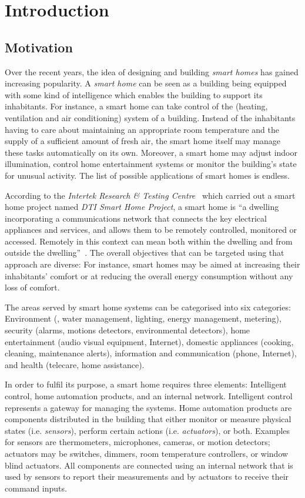 \chapter{Introduction}
\label{ch:intro}

\section{Motivation}
\label{sec:motivation}

Over the recent years, the idea of designing and building \emph{smart homes} has gained increasing popularity. A \emph{smart home} can be seen as a building being equipped with some kind of intelligence which enables the building to support its inhabitants. For instance, a smart home can take control of the  (heating, ventilation and air conditioning) system of a building. Instead of the inhabitants having to care about maintaining an appropriate room temperature and the supply of a sufficient amount of fresh air, the smart home itself may manage these tasks automatically on its own. Moreover, a smart home may adjust indoor illumination, control home entertainment systems or monitor the building's state for unusual activity. The list of possible applications of smart homes is endless.

According to the \emph{Intertek Research \& Testing Centre}~\cite{intertek} which carried out a smart home project named \emph{DTI Smart Home Project}, a smart home is ``a dwelling incorporating a communications network that connects the key electrical appliances and services, and allows them to be remotely controlled, monitored or accessed. Remotely in this context can mean both within the dwelling and from outside the dwelling''~\cite{SmartHomeDefinition,SmartHomeResearch}. The overall objectives that can be targeted using that approach are diverse: For instance, smart homes may be aimed at increasing their inhabitants' comfort or at reducing the overall energy consumption without any loss of comfort.

The areas served by smart home systems can be categorised into six categories: Environment (, water management, lighting, energy management, metering), security (alarms, motions detectors, environmental detectors), home entertainment (audio visual equipment, Internet), domestic appliances (cooking, cleaning, maintenance alerts), information and communication (phone, Internet), and health (telecare, home assistance).

In order to fulfil its purpose, a smart home requires three elements: Intelligent control, home automation products, and an internal network. Intelligent control represents a gateway for managing the systems. Home automation products are components distributed in the building that either monitor or measure physical states (i.e. \emph{sensors}), perform certain actions (i.e. \emph{actuators}), or both. Examples for sensors are thermometers, microphones, cameras, or motion detectors; actuators may be switches, dimmers, room temperature controllers, or window blind actuators. All components are connected using an internal network that is used by sensors to report their measurements and by actuators to receive their command inputs.

